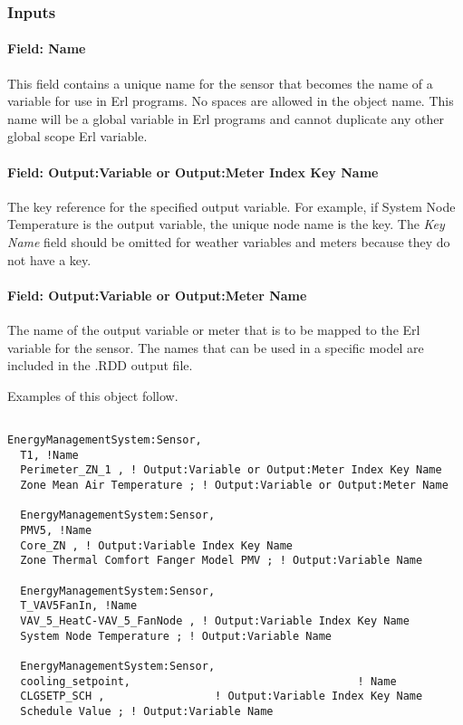 \subsubsection{Inputs}\label{inputs-015}

\paragraph{Field: Name}\label{field-name-014}

This field contains a unique name for the sensor that becomes the name of a variable for use in Erl programs. No spaces are allowed in the object name. This name will be a global variable in Erl programs and cannot duplicate any other global scope Erl variable.

\paragraph{Field: Output:Variable or Output:Meter Index Key Name}\label{field-outputvariable-or-outputmeter-index-key-name}

The key reference for the specified output variable. For example, if System Node Temperature is the output variable, the unique node name is the key. The \emph{Key Name} field should be omitted for weather variables and meters because they do not have a key.

\paragraph{Field: Output:Variable or Output:Meter Name}\label{field-outputvariable-or-outputmeter-name}

The name of the output variable or meter that is to be mapped to the Erl variable for the sensor. The names that can be used in a specific model are included in the .RDD output file.

Examples of this object follow.

\begin{lstlisting}

EnergyManagementSystem:Sensor,
  T1, !Name
  Perimeter_ZN_1 , ! Output:Variable or Output:Meter Index Key Name
  Zone Mean Air Temperature ; ! Output:Variable or Output:Meter Name

  EnergyManagementSystem:Sensor,
  PMV5, !Name
  Core_ZN , ! Output:Variable Index Key Name
  Zone Thermal Comfort Fanger Model PMV ; ! Output:Variable Name

  EnergyManagementSystem:Sensor,
  T_VAV5FanIn, !Name
  VAV_5_HeatC-VAV_5_FanNode , ! Output:Variable Index Key Name
  System Node Temperature ; ! Output:Variable Name

  EnergyManagementSystem:Sensor,
  cooling_setpoint,                                   ! Name
  CLGSETP_SCH ,                 ! Output:Variable Index Key Name
  Schedule Value ; ! Output:Variable Name
\end{lstlisting}

